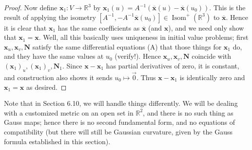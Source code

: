 \documentclass[leqno]{book}
\begin{document}
\begin{proof}
Now define $\mathbf x_1:V\to\mathbb R^3$ by $\mathbf x_1(u)=A^{-1}(\overline{\mathbf x}(u)-\overline{\mathbf x}(u_0))$.  This is the result of applying the isometry $[A^{-1},-A^{-1}\overline{\mathbf x}(u_0)]\in\operatorname{Isom}^+(\mathbb R^3)$ to $\overline{\mathbf x}$.  Hence it is clear that $\mathbf x_1$ has the same coefficients as $\overline{\mathbf x}$ (and $\mathbf x$), and we need only show that $\mathbf x_1=\mathbf x$.  Well, all this basically uses uniqueness in initial value problems; first $\mathbf x_u,\mathbf x_v,\mathbf N$ satisfy the same differential equations (A) that those things for $\mathbf x_1$ do, and they have the same values at $u_0$ (verify!).  Hence $\mathbf x_u,\mathbf x_v,\mathbf N$ coincide with $(\mathbf x_1)_u,(\mathbf x_1)_v,\mathbf N_1$.  Since $\mathbf x-\mathbf x_1$ has partial derivatives of zero, it is constant, and construction also shows it sends $u_0\mapsto\vec 0$.  Thus $\mathbf x-\mathbf x_1$ is identically zero and $\mathbf x_1=\mathbf x$ as desired.
\end{proof}

\noindent Note that in Section 6.10, we will handle things differently.  We will be dealing with a customized metric on an open set in $\mathbb R^2$, and there is no such thing as Gauss maps; hence there is no second fundamental form, and no equations of compatibility (but there will still be Gaussian curvature, given by the Gauss formula established in this section). %
\end{document}
